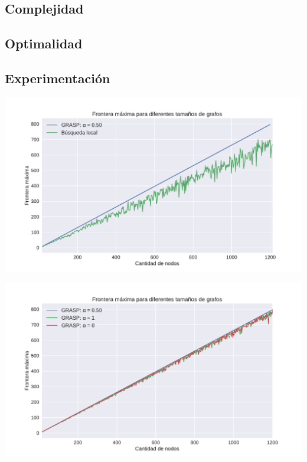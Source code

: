 \subsection{Complejidad}


\subsection{Optimalidad}


\subsection{Experimentación}

{\centering
    \includegraphics[width=1\textwidth]{informe/imgs/exp_malo_frontera_grasp_local.pdf}
}

{\centering
    \includegraphics[width=1\textwidth]{informe/imgs/exp_malo_frontera_grasp.pdf}
}

